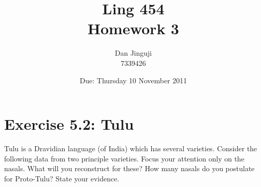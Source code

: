 \documentclass[12pt]{article}
\begin{document}
\title{Ling 454 \\ Homework 3}
\author{Dan Jinguji \\ 7339426}
\date{Due: Thursday 10 November 2011}

\maketitle

\renewcommand\thesection {\arabic{section}:}
\renewcommand\thesubsection {(\arabic{subsection})}
\renewcommand\thesubsubsection{\alph{subsubsection}.}
\newcommand{\and}{\,\&\;}
\newcommand{\llb}{\ensuremath{\llbracket}}
\newcommand{\rrb}{\ensuremath{\rrbracket}}
\newcommand{\blt}{\ensuremath{\bullet\;}}
\newcommand{\sem}[1]{\ensuremath{\llbracket\mathrm{#1}\rrbracket}}
\newcommand{\und}{\ensuremath{\_\,}}
\newcommand{\then}{\ensuremath{\rightarrow}}
\newcommand{\dom}[1]{\ensuremath{\mathbf{D}_{\mathrm{#1}}}}
\newcommand{\lamb}[3]{{[\ensuremath{\lambda\mathrm{#1}\;\in\;{#2}\;.\;}{#3}]}}
\newcommand{\ip}[1]{\textipa{#1}}
\newcommand{\rd}{\textrtaild}

\section{Exercise 5.2: Tulu}

Tulu is a Dravidian language (of India) which has several varieties. Consider the following data from two principle varieties. Focus your attention only on the nasals. What will you reconstruct for these? How many nasals do you postulate for Proto-Tulu? State your evidence. \\
\end{document}
